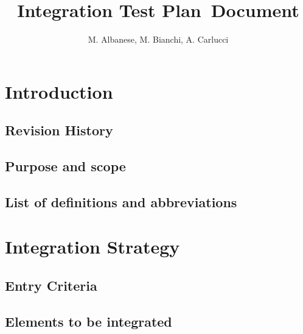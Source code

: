 \documentclass[a4paper, 11pt]{article}
\begin{document}
\title{Integration Test Plan Document}

\author{M. Albanese, M. Bianchi, A. Carlucci}

\maketitle
\newpage{}
\tableofcontents{}

\newpage{}

\section{Introduction}
\subsection{Revision History} 
\label{sub:revision_history}

\subsection{Purpose and scope} 
\label{sub:purpose_and_scope}

\subsection{List of definitions and abbreviations} 
\label{sub:list_of_definitions_and_abbreviations}

\section{Integration Strategy} 
\label{sec:integration_strategy}

\subsection{Entry Criteria} 
\label{sub:entry_criteria}

\subsection{Elements to be integrated} 
\label{sub:elements_to_be_integrated}
\end{document}
